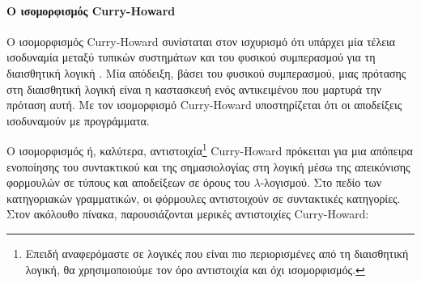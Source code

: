 \documentclass [a4paper,11pt] {book}
\theoremstyle{definition}
\theoremstyle{definition}
\begin{document}
\paragraph{Ο ισομορφισμός Curry-Howard}
\label{CurryHoward-Iso}
Ο ισομορφισμός Curry-Howard συνίσταται στον ισχυρισμό ότι υπάρχει μία τέλεια ισοδυναμία μεταξύ τυπικών συστημάτων και του φυσικού συμπερασμού για τη διαισθητική λογική \citep{Sørensen98lectureson}. Μία απόδειξη, βάσει του φυσικού συμπερασμού, μιας πρότασης στη διαισθητική λογική είναι η καστασκευή ενός αντικειμένου που μαρτυρά την πρόταση αυτή. Με τον ισομορφισμό Curry-Howard υποστηρίζεται ότι οι αποδείξεις ισοδυναμούν με προγράμματα.

Ο ισομορφισμός ή, καλύτερα, αντιστοιχία\footnote{Επειδή αναφερόμαστε σε λογικές που είναι πιο περιορισμένες από τη διαισθητική λογική,  θα χρησιμοποιούμε τον όρο αντιστοιχία και όχι ισομορφισμός.} Curry-Howard πρόκειται για μια απόπειρα ενοποίησης του συντακτικού και της σημασιολογίας στη λογική μέσω της απεικόνισης φορμουλών σε τύπους και αποδείξεων σε όρους του $\lambda$-λογισμού. Στο πεδίο των κατηγοριακών γραμματικών, οι φόρμουλες αντιστοιχούν σε συντακτικές κατηγορίες. Στον ακόλουθο πίνακα, παρουσιάζονται μερικές αντιστοιχίες Curry-Howard:
\end{document}
